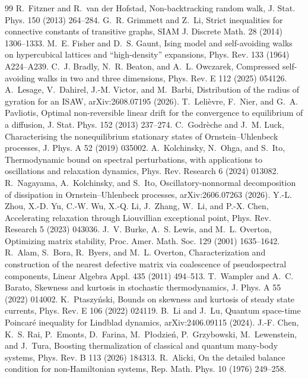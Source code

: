 \documentclass[11pt]{article}
\theoremstyle{definition}
\begin{document}
\begin{thebibliography}{99}
 R.~Fitzner and R.~van der Hofstad, Non-backtracking random walk, J. Stat. Phys. 150 (2013) 264--284.
 G.~R. Grimmett and Z.~Li, Strict inequalities for connective constants of transitive graphs, SIAM J. Discrete Math. 28 (2014) 1306--1333.
 M.~E. Fisher and D.~S. Gaunt, Ising model and self-avoiding walks on hypercubical lattices and ``high-density'' expansions, Phys. Rev. 133 (1964) A224--A239.
 C.~J. Bradly, N.~R. Beaton, and A.~L. Owczarek, Compressed self-avoiding walks in two and three dimensions, Phys. Rev. E 112 (2025) 054126.
 A.~Lesage, V.~Dahirel, J.-M. Victor, and M.~Barbi, Distribution of the radius of gyration for an ISAW, arXiv:2608.07195 (2026).
 T.~Leli\`evre, F.~Nier, and G.~A. Pavliotis, Optimal non-reversible linear drift for the convergence to equilibrium of a diffusion, J. Stat. Phys. 152 (2013) 237--274.
 C.~Godr\`eche and J.~M. Luck, Characterising the nonequilibrium stationary states of Ornstein--Uhlenbeck processes, J. Phys. A 52 (2019) 035002.
 A.~Kolchinsky, N.~Ohga, and S.~Ito, Thermodynamic bound on spectral perturbations, with applications to oscillations and relaxation dynamics, Phys. Rev. Research 6 (2024) 013082.
 R.~Nagayama, A.~Kolchinsky, and S.~Ito, Oscillatory-nonnormal decomposition of dissipation in Ornstein--Uhlenbeck processes, arXiv:2606.07263 (2026).
 Y.-L. Zhou, X.-D. Yu, C.-W. Wu, X.-Q. Li, J.~Zhang, W.~Li, and P.-X. Chen, Accelerating relaxation through Liouvillian exceptional point, Phys. Rev. Research 5 (2023) 043036.
 J.~V. Burke, A.~S. Lewis, and M.~L. Overton, Optimizing matrix stability, Proc. Amer. Math. Soc. 129 (2001) 1635--1642.
 R.~Alam, S.~Bora, R.~Byers, and M.~L. Overton, Characterization and construction of the nearest defective matrix via coalescence of pseudospectral components, Linear Algebra Appl. 435 (2011) 494--513.
 T.~Wampler and A.~C. Barato, Skewness and kurtosis in stochastic thermodynamics, J. Phys. A 55 (2022) 014002.
 K.~Ptaszy\'nski, Bounds on skewness and kurtosis of steady state currents, Phys. Rev. E 106 (2022) 024119.
 B.~Li and J.~Lu, Quantum space-time Poincar\'e inequality for Lindblad dynamics, arXiv:2406.09115 (2024).
 J.-F. Chen, K.~S. Rai, P.~Emonts, D.~Farina, M.~P\l odzie\'n, P.~Grzybowski, M.~Lewenstein, and J.~Tura, Boosting thermalization of classical and quantum many-body systems, Phys. Rev. B 113 (2026) 184313.
 R.~Alicki, On the detailed balance condition for non-Hamiltonian systems, Rep. Math. Phys. 10 (1976) 249--258.

\end{thebibliography}
\end{document}
